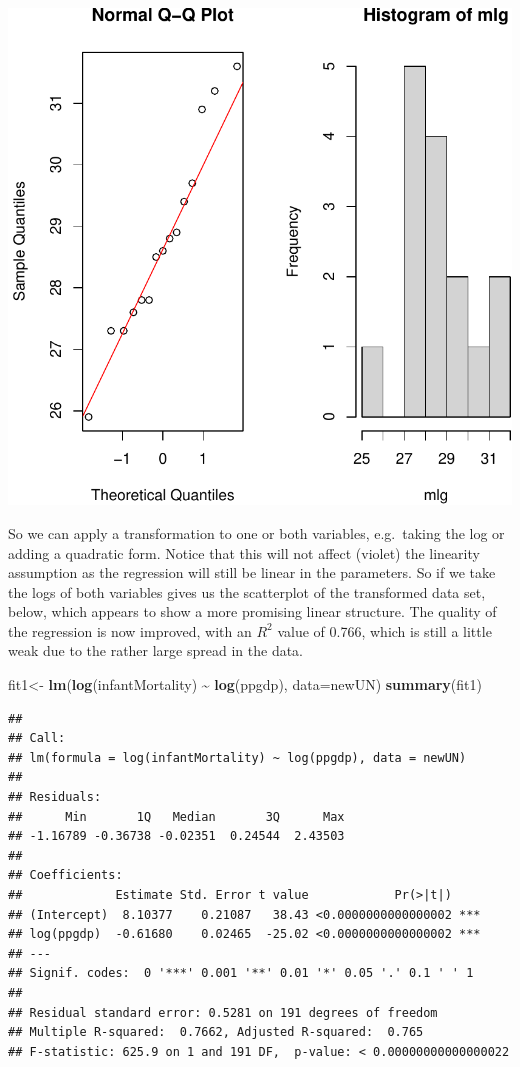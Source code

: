 \documentclass[
]{article}
\newenvironment{Shaded}{\begin{snugshade}}{\end{snugshade}}
\newcommand{\AttributeTok}[1]{\textcolor[rgb]{0.13,0.29,0.53}{#1}}
\newcommand{\FunctionTok}[1]{\textcolor[rgb]{0.13,0.29,0.53}{\textbf{#1}}}
\newcommand{\NormalTok}[1]{#1}
\newcommand{\OtherTok}[1]{\textcolor[rgb]{0.56,0.35,0.01}{#1}}
\newcommand{\SpecialCharTok}[1]{\textcolor[rgb]{0.81,0.36,0.00}{\textbf{#1}}}
\begin{document}
\begin{center}\includegraphics[width=0.6\linewidth,height=0.6\textheight]{unnamed-chunk-60-1} \end{center}

So we can apply a transformation to one or both variables, e.g.~taking
the log or adding a quadratic form. Notice that this will not affect
(violet) the linearity assumption as the regression will still be linear
in the parameters. So if we take the logs of both variables gives us the
scatterplot of the transformed data set, below, which appears to show a
more promising linear structure. The quality of the regression is now
improved, with an \(R^2\) value of 0.766, which is still a little weak
due to the rather large spread in the data.

\begin{Shaded}
\begin{Highlighting}[]
\NormalTok{fit1}\OtherTok{\textless{}{-}} \FunctionTok{lm}\NormalTok{(}\FunctionTok{log}\NormalTok{(infantMortality) }\SpecialCharTok{\textasciitilde{}} \FunctionTok{log}\NormalTok{(ppgdp), }\AttributeTok{data=}\NormalTok{newUN)}
\FunctionTok{summary}\NormalTok{(fit1)}
\end{Highlighting}
\end{Shaded}

\begin{verbatim}
## 
## Call:
## lm(formula = log(infantMortality) ~ log(ppgdp), data = newUN)
## 
## Residuals:
##      Min       1Q   Median       3Q      Max 
## -1.16789 -0.36738 -0.02351  0.24544  2.43503 
## 
## Coefficients:
##             Estimate Std. Error t value            Pr(>|t|)    
## (Intercept)  8.10377    0.21087   38.43 <0.0000000000000002 ***
## log(ppgdp)  -0.61680    0.02465  -25.02 <0.0000000000000002 ***
## ---
## Signif. codes:  0 '***' 0.001 '**' 0.01 '*' 0.05 '.' 0.1 ' ' 1
## 
## Residual standard error: 0.5281 on 191 degrees of freedom
## Multiple R-squared:  0.7662, Adjusted R-squared:  0.765 
## F-statistic: 625.9 on 1 and 191 DF,  p-value: < 0.00000000000000022
\end{verbatim}
\end{document}
